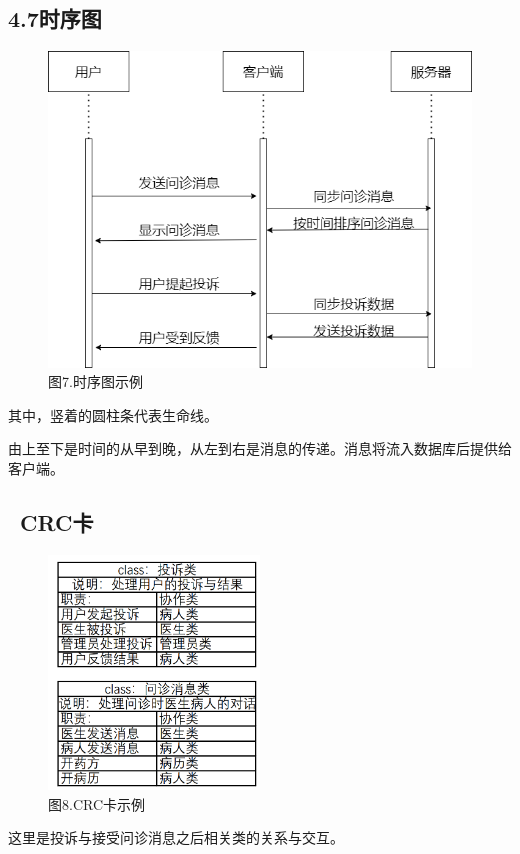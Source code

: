 \documentclass[24pt,a4paper]{article}%
\begin{document}
\subsection*{\songti 4.7时序图}
\begin{figure}[H]
    \centering
    \includegraphics[width=1\textwidth]{images/time.png}
    \caption*{图7.时序图示例}
\end{figure}
其中，竖着的圆柱条代表生命线。\par
由上至下是时间的从早到晚，从左到右是消息的传递。消息将流入数据库后提供给客户端。\par
\subsection*{\ CRC卡}
\begin{figure}[H]
    \centering
    \includegraphics[width=0.5\textwidth]{images/CRCCard.png}
    \caption*{图8.CRC卡示例}
\end{figure}
这里是投诉与接受问诊消息之后相关类的关系与交互。
\newpage
\end{document}
